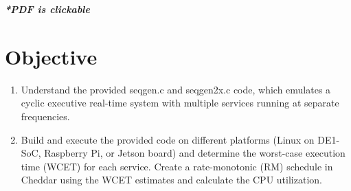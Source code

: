 \documentclass[a4paper,11pt]{article}%
\begin{document}



\pagebreak

\tableofcontents
\listoffigures
\listoftables
\vfill
\begin{center}
	\textbf{\textit{*PDF is clickable}}
\end{center}

\pagebreak

\section*{Objective}
\begin{enumerate}
	\item Understand the provided seqgen.c and seqgen2x.c code, which emulates a cyclic executive real-time system with multiple services running at separate frequencies.
	
	\item Build and execute the provided code on different platforms (Linux on DE1-SoC, Raspberry Pi, or Jetson board) and determine the worst-case execution time (WCET) for each service. Create a rate-monotonic (RM) schedule in Cheddar using the WCET estimates and calculate the CPU utilization.

\end{enumerate}
\end{document}
